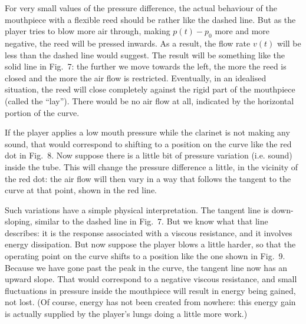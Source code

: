   For very small values of the pressure difference, the actual behaviour of the 
  mouthpiece with a flexible reed should be rather like the dashed line. But as 
  the player tries to blow more air through, making $p(t)-p_0$ more and more 
  negative, the reed will be pressed inwards. As a result, the flow rate $v(t)$ 
  will be less than the dashed line would suggest. The result will be something 
  like the solid line in Fig.\ 7: the further we move towards the left, the 
  more the reed is closed and the more the air flow is restricted. Eventually, 
  in an idealised situation, the reed will close completely against the rigid 
  part of the mouthpiece (called the “lay”). There would be no air flow at all, 
  indicated by the horizontal portion of the curve. 

  If the player applies a low mouth pressure while the clarinet is not making 
  any sound, that would correspond to shifting to a position on the curve like 
  the red dot in Fig.\ 8. Now suppose there is a little bit of pressure 
  variation (i.e. sound) inside the tube. This will change the pressure 
  difference a little, in the vicinity of the red dot: the air flow will then 
  vary in a way that follows the tangent to the curve at that point, shown in 
  the red line. 


  Such variations have a simple physical interpretation. The tangent line is 
  down-sloping, similar to the dashed line in Fig.\ 7. But we know what that 
  line describes: it is the response associated with a viscous resistance, and 
  it involves energy dissipation. But now suppose the player blows a little 
  harder, so that the operating point on the curve shifts to a position like 
  the one shown in Fig.\ 9. Because we have gone past the peak in the curve, 
  the tangent line now has an upward slope. That would correspond to a negative 
  viscous resistance, and small fluctuations in pressure inside the mouthpiece 
  will result in energy being gained, not lost. (Of course, energy has not been 
  created from nowhere: this energy gain is actually supplied by the player’s 
  lungs doing a little more work.) 


